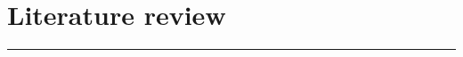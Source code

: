\chapter{Literature review}
\label{C4} %
\graphicspath{{Figures/PDF/}{Figures/PNG/}}
\noindent\rule{\linewidth}{2pt}


